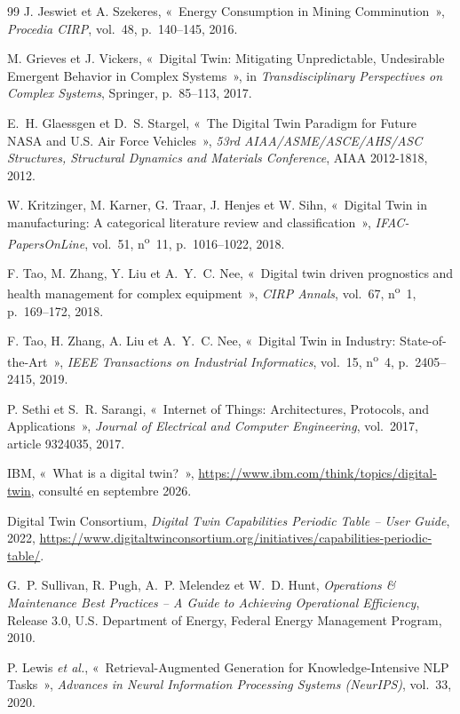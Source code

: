 \begin{thebibliography}{99}
 J. Jeswiet et A. Szekeres, «~Energy Consumption in Mining Comminution~», \textit{Procedia CIRP}, vol.~48, p.~140--145, 2016.

 M. Grieves et J. Vickers, «~Digital Twin: Mitigating Unpredictable, Undesirable Emergent Behavior in Complex Systems~», in \textit{Transdisciplinary Perspectives on Complex Systems}, Springer, p.~85--113, 2017.

 E.~H. Glaessgen et D.~S. Stargel, «~The Digital Twin Paradigm for Future NASA and U.S. Air Force Vehicles~», \textit{53rd AIAA/ASME/ASCE/AHS/ASC Structures, Structural Dynamics and Materials Conference}, AIAA 2012-1818, 2012.

 W. Kritzinger, M. Karner, G. Traar, J. Henjes et W. Sihn, «~Digital Twin in manufacturing: A categorical literature review and classification~», \textit{IFAC-PapersOnLine}, vol.~51, n\textsuperscript{o}~11, p.~1016--1022, 2018.

 F. Tao, M. Zhang, Y. Liu et A.~Y.~C. Nee, «~Digital twin driven prognostics and health management for complex equipment~», \textit{CIRP Annals}, vol.~67, n\textsuperscript{o}~1, p.~169--172, 2018.

 F. Tao, H. Zhang, A. Liu et A.~Y.~C. Nee, «~Digital Twin in Industry: State-of-the-Art~», \textit{IEEE Transactions on Industrial Informatics}, vol.~15, n\textsuperscript{o}~4, p.~2405--2415, 2019.

 P. Sethi et S.~R. Sarangi, «~Internet of Things: Architectures, Protocols, and Applications~», \textit{Journal of Electrical and Computer Engineering}, vol.~2017, article 9324035, 2017.

 IBM, «~What is a digital twin?~», \url{https://www.ibm.com/think/topics/digital-twin}, consulté en septembre 2026.

 Digital Twin Consortium, \textit{Digital Twin Capabilities Periodic Table -- User Guide}, 2022, \url{https://www.digitaltwinconsortium.org/initiatives/capabilities-periodic-table/}.

 G.~P. Sullivan, R. Pugh, A.~P. Melendez et W.~D. Hunt, \textit{Operations \& Maintenance Best Practices -- A Guide to Achieving Operational Efficiency}, Release 3.0, U.S. Department of Energy, Federal Energy Management Program, 2010.

 P. Lewis \textit{et al.}, «~Retrieval-Augmented Generation for Knowledge-Intensive NLP Tasks~», \textit{Advances in Neural Information Processing Systems (NeurIPS)}, vol.~33, 2020.


\end{thebibliography}
